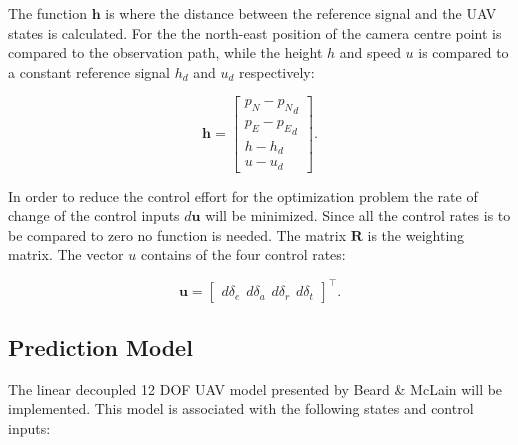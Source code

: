 The function $\mathbf{h}$ is where the distance between the reference signal and the UAV states is calculated. For the the north-east position of the camera centre point is compared to the observation path, while the height $h$ and speed $u$ is compared to a constant reference signal $h_d$ and $u_d$ respectively:

\begin{equation}
	\mathbf{h} =
	\begin{bmatrix}
		p_N - {p_N}_d \\
		p_E - {p_E}_d \\
		h - h_d \\
		u - u_d
	\end{bmatrix}.
\end{equation}

In order to reduce the control effort for the optimization problem the rate of change of the control inputs $d\mathbf{u}$ will be minimized. Since all the control rates is to be compared to zero no function is needed. The matrix $\mathbf{R}$ is the weighting matrix. The vector $u$ contains of the four control rates:

\begin{equation}
	\mathbf{u} = 
	\begin{bmatrix}
		d\delta_e \hspace{5pt} d\delta_a \hspace{5pt} d\delta_r \hspace{5pt} d\delta_t
	\end{bmatrix} ^\intercal .
\end{equation}


\subsection{Prediction Model}

The linear decoupled 12 DOF UAV model presented by Beard \& McLain \cite{uavBEARD} will be implemented. This model is associated with the following states and control inputs:

